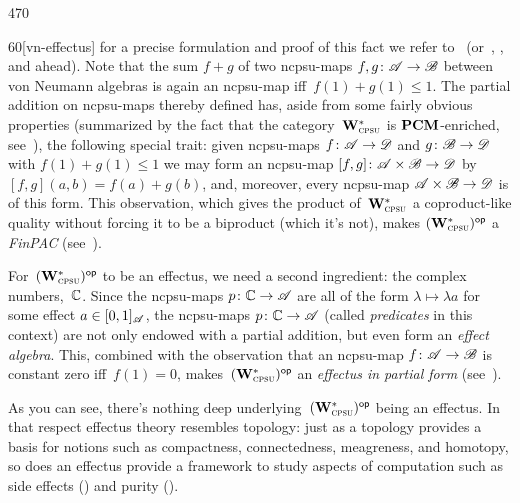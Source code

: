 \begin{parsec}{470}
\begin{point}{60}[vn-effectus]
for a precise formulation and proof of this fact
we refer to~\cite{effintro,kentapartial}
(or~, 
, and  ahead).
Note that the sum $f+g$ of two ncpsu-maps
$f,g\colon \mathscr{A}\to\mathscr{B}$ between von Neumann algebras
is again an ncpsu-map
iff~$f(1)+g(1)\leq 1$.
The partial addition on ncpsu-maps
thereby defined
has, aside from some fairly obvious properties
(summarized by the
fact that the category~$\mathbf{W}^*_{\text{\textsc{cpsu}}}$
    is $\mathbf{PCM}$-enriched, see~\cite{kentapartial}),
the following special trait:
given ncpsu-maps $f\colon \mathscr{A}\to\mathscr{D}$
and $g\colon \mathscr{B}\to\mathscr{D}$
with $f(1)+g(1)\leq 1$
we may form an ncpsu-map $[f,g]\colon \mathscr{A}\times \mathscr{B}\to \mathscr{D}$
by $[f,g](a,b)=f(a)+g(b)$,
and, moreover,
every ncpsu-map $\mathscr{A}\times\mathscr{B}\to\mathscr{D}$ is of this form.
This observation, which gives the product of~$\mathbf{W}^*_{\text{\textsc{cpsu}}}$ a coproduct-like quality
without forcing it to be a biproduct (which it's not),
	makes ${(\mathbf{W}^*_{\text{\textsc{cpsu}}})}{^{\mathsf{op}}}$ a \emph{FinPAC} 
	(see~).

	For~${(\mathbf{W}^*_{\text{\textsc{cpsu}}})}{^{\mathsf{op}}}$ to be an effectus,
we need a second ingredient:
 the complex numbers,~$\mathbb{C}$.
Since the ncpsu-maps $p\colon \mathbb{C}\to \mathscr{A}$
are all of the form $\lambda \mapsto \lambda a$
for some effect $a\in [0,1]_{\mathscr{A}}$,
the ncpsu-maps $p\colon \mathbb{C}\to\mathscr{A}$
(called \emph{predicates} in this context)
are not only endowed with a partial addition,
but even form an \emph{effect algebra}.
This,
combined with the observation that
an ncpsu-map $f\colon \mathscr{A}\to\mathscr{B}$
is constant zero iff~$f(1)=0$,
makes~${(\mathbf{W}^*_{\text{\textsc{cpsu}}})}{^{\mathsf{op}}}$
an \emph{effectus in partial form} (see~).

As you can see, there's nothing deep underlying~${(\mathbf{W}^*_{\text{\textsc{cpsu}}})}{^{\mathsf{op}}}$
being an effectus.
In that respect effectus theory resembles topology:
just as a topology 
provides a basis for  
notions such as compactness, connectedness, meagreness, and homotopy,
so does an
effectus provide a framework to study
 aspects of  computation
such as side effects () and purity
().
\end{point}
\end{parsec}
